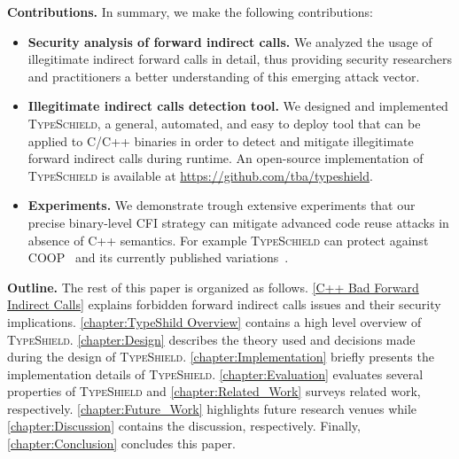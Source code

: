 \textbf{Contributions.} In summary, we make the following contributions:
\label{Contribution}
\begin{itemize}
 \item \textbf{Security analysis of forward indirect calls.} 
 We analyzed the usage of illegitimate indirect forward calls in detail,
 thus providing security researchers and
practitioners a better understanding of this emerging
attack vector.

 \item \textbf{Illegitimate indirect calls detection tool.}
 We designed and implemented \textsc{TypeSchield}, a general, automated, and easy to deploy tool
 that can be applied to C/C++ binaries in order to detect and mitigate illegitimate forward indirect calls 
 during runtime. An open-source implementation of \textsc{TypeSchield} is available at \url{https://github.com/tba/typeshield}.
 
 \item \textbf{Experiments.} We demonstrate trough extensive experiments that our precise
 binary-level CFI strategy can mitigate advanced code reuse attacks in absence of C++ semantics.
 For example \textsc{TypeSchield} can protect against COOP~\cite{schuster:coop} and its currently published 
 variations~\cite{crane:readactor++, subversive-c:lettner, ctf:coop, loop:oriented}.
  
\end{itemize}

\label{Outline}
\textbf{Outline.} The rest of this paper is organized as follows.
\cref{C++ Bad Forward Indirect Calls} explains forbidden forward indirect calls issues and their security implications.
\cref{chapter:TypeShild Overview} contains a high level overview of \textsc{TypeShield}.
\cref{chapter:Design} describes the theory used and decisions made during the design of \textsc{TypeShield}.
\cref{chapter:Implementation} briefly presents the implementation details of \textsc{TypeShield}.
\cref{chapter:Evaluation} evaluates several properties of \textsc{TypeShield} and
\cref{chapter:Related_Work} surveys related work, respectively.
\cref{chapter:Future_Work} highlights future research venues while 
\cref{chapter:Discussion} contains the discussion, respectively.
Finally, \cref{chapter:Conclusion} concludes this paper.


